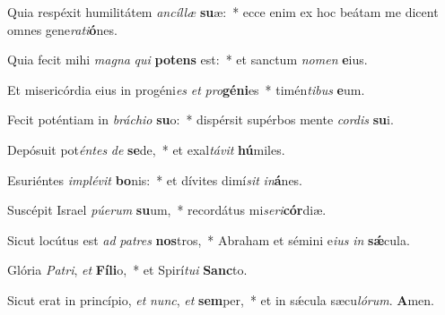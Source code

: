 \item Quia respéxit humilitátem \textit{ancíllæ} \textbf{su}æ:~* ecce enim ex hoc beátam me dicent omnes gene\textit{rati}\textbf{ó}nes.

\item Quia fecit mihi \textit{magna} \textit{qui} \textbf{pot}\textbf{ens} est:~* et sanctum \textit{nomen} \textbf{e}ius.

\item Et misericórdia eius in progéni\textit{es} \textit{et} \textit{pro}\textbf{gé}\textbf{ni}es~* timén\textit{tibus} \textbf{e}um.

\item Fecit poténtiam in \textit{bráchio} \textbf{su}o:~* dispérsit supérbos mente \textit{cordis} \textbf{su}i.

\item Depósuit pot\textit{éntes} \textit{de} \textbf{se}de,~* et exal\textit{távit} \textbf{hú}miles.

\item Esuriéntes \textit{implévit} \textbf{bo}nis:~* et dívites dimí\textit{sit} \textit{in}\textbf{á}nes.

\item Suscépit Israel \textit{púerum} \textbf{su}um,~* recordátus mi\textit{seri}\textbf{cór}diæ.

\item Sicut locútus est \textit{ad} \textit{patres} \textbf{nos}tros,~* Abraham et sémini e\textit{ius} \textit{in} \textbf{sǽ}cula.

\item Glória \textit{Patri}, \textit{et} \textbf{Fí}\textbf{li}o,~* et Spirí\textit{tui} \textbf{Sanc}to.

\item Sicut erat in princípio, \textit{et} \textit{nunc}, \textit{et} \textbf{sem}per,~* et in sǽcula sæcu\textit{lórum}. \textbf{A}men.